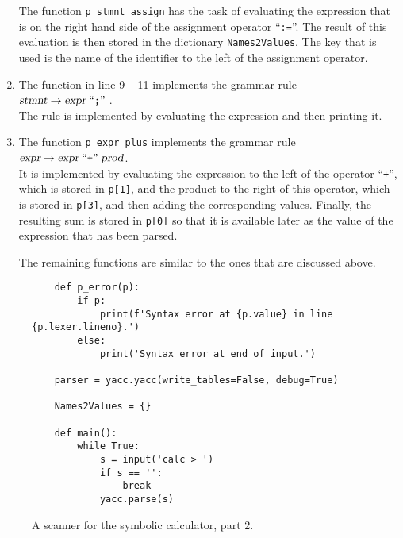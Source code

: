\begin{enumerate}
      The function \texttt{p\_stmnt\_assign} has the task of evaluating the expression that is on the right
      hand side of the assignment operator ``\texttt{:=}''.  The result of this evaluation is then stored in the
      dictionary \texttt{Names2Values}.  The key that is used is the name of the identifier to the left of the
      assignment operator.
\item The function in line 9 -- 11 implements the grammar rule
      \\[0.2cm]
      \hspace*{1.3cm}
      $\textsl{stmnt} \rightarrow \textsl{expr} \;\mbox{``\texttt{;}''}\;$.
      \\[0.2cm]
      The rule is implemented by evaluating the expression and then printing it.
\item The function \texttt{p\_expr\_plus} implements the grammar rule
      \\[0.2cm]
      \hspace*{1.3cm}
      $\textsl{expr} \rightarrow \textsl{expr} \;\mbox{``\texttt{+}''}\; \textsl{prod}$.
      \\[0.2cm]
      It is implemented by evaluating the expression to the left of the operator ``\texttt{+}'', which is
      stored in \texttt{p[1]}, and the product to the right of this operator, which is stored in \texttt{p[3]},
      and then adding the corresponding values.  Finally, the resulting sum is stored in \texttt{p[0]} so that
      it is available later as the value of the expression that has been parsed.

      The remaining functions are similar to the ones that are discussed above.
\end{enumerate}

\begin{figure}[!ht]
\centering
\begin{verbatim}
    def p_error(p):
        if p:
            print(f'Syntax error at {p.value} in line {p.lexer.lineno}.')
        else:
            print('Syntax error at end of input.')
        
    parser = yacc.yacc(write_tables=False, debug=True)

    Names2Values = {}
    
    def main():
        while True:
            s = input('calc > ')
            if s == '':
                break
            yacc.parse(s)
\end{verbatim}
\vspace*{-0.3cm}
\caption{A scanner for the symbolic calculator, part 2.}
\label{fig:Symbolic-Calculator.ipynb:yacc2}
\end{figure}
\FloatBarrier

